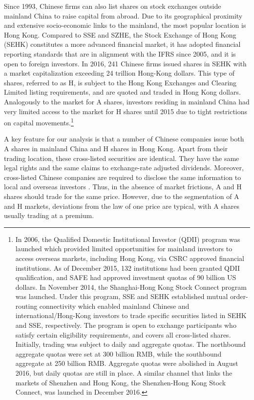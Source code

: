 \documentclass[11pt]{article}
\begin{document}
Since 1993, Chinese firms can also list shares on stock exchanges outside mainland China to raise capital from abroad. Due to its geographical proximity and extensive socio-economic links to the mainland, the most popular location is Hong Kong. Compared to SSE and SZHE, the Stock Exchange of Hong Kong (SEHK) constitutes a more advanced financial market, it has adopted financial reporting standards that are in alignment with the IFRS since 2005, and it is open to foreign investors. In 2016, 241 Chinese firms issued shares in SEHK with a market capitalization exceeding 24 trillion Hong-Kong dollars. This type of shares, referred to as H, is subject to the Hong Kong Exchanges and Clearing Limited listing requirements, and are quoted and traded in Hong Kong dollars. Analogously to the market for A shares, investors residing in mainland China had very limited access to the market for H shares until 2015 due to tight restrictions on capital movements.\footnote{In 2006, the Qualified Domestic Institutional Investor (QDII) program was launched which provided limited opportunities for mainland investors to access overseas markets, including Hong Kong, via CSRC approved financial institutions. As of December 2015, 132 institutions  had been granted QDII qualification, and SAFE had approved investment quotas of 90 billion US dollars. In November 2014, the Shanghai-Hong Kong Stock Connect program was launched. Under this program, SSE and SEHK  established mutual order-routing connectivity which enabled mainland Chinese and international/Hong-Kong investors to trade specific securities listed in SEHK and SSE, respectively. The program is open to exchange participants who satisfy certain eligibility requirements, and covers all cross-listed shares. Initially, trading was subject to daily and aggregate quotas. The northbound aggregate quotas were set at 300 billion RMB, while the southbound aggregate at 250 billion RMB. Aggregate quotas were abolished in August 2016, but daily quotas are still in place. A similar channel that links the markets of Shenzhen and Hong Kong, the Shenzhen-Hong Kong Stock Connect, was launched in December 2016.}

A key feature for our analysis is that a number of Chinese companies issue both A shares  in mainland China and H shares in Hong Kong. Apart from their trading location, these cross-listed securities are identical. They have the same legal rights and the same claims to exchange-rate adjusted dividends. Moreover, cross-listed Chinese companies are required to disclose the same information to local and overseas investors \citep{jiaWX2017}. Thus, in the absence of market frictions, A and H shares should trade for the same price. However, due to the segmentation of A and H markets, deviations from the law of one price are typical, with A shares usually trading at a premium. 
\end{document}
